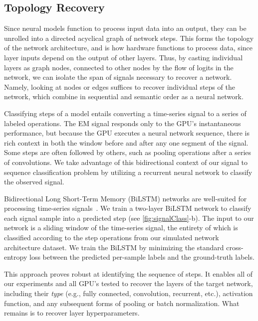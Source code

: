 \documentclass[12pt]{report}
\begin{document}
\vspace{-2mm}
\subsection{Topology Recovery}\label{sec:topo}

Since neural models function to process input data into an output,
they can be unrolled into a directed acyclical graph of network steps.
This forms the topology of the network architecture, and is how
hardware functions to process data, since layer inputs
depend on the output of other layers.
Thus, by casting individual layers as graph nodes, 
connected to other nodes by the flow of logits in the network,
we can isolate the span of signals necessary to recover a network.
Namely, looking at nodes or edges suffices to recover individual
steps of the network, which combine in sequential and semantic order
as a neural network.

Classifying steps of a model entails converting a time-series signal 
to a series of labeled operations. 
The EM signal responds only to the GPU's instantaneous performance, 
but because the GPU executes a neural network sequence, there is rich context
in both the window before and after any one segment of the signal.
Some steps are often followed by others, such as pooling operations after a series of convolutions. 
We take advantage of this bidirectional context of our signal to sequence classification problem by utilizing a recurrent neural network to classify the observed signal. 

Bidirectional Long Short-Term Memory (BiLSTM) networks are well-suited 
for processing time-series signals~\cite{graves2005bidirectional}. 
We train a two-layer BiLSTM network to classify each signal sample 
into a predicted step (see \ref{fig:signalClass}-b). 
The input to our network is a sliding window of the time-series signal,
the entirety of which is classified according to the step operations
from our simulated network architecture dataset.
We train the BiLSTM by
minimizing the standard cross-entropy loss between the predicted per-sample
labels and the ground-truth labels.

This approach proves robust at identifying the sequence of steps.
It enables all of our
experiments and all GPU's tested to
recover the layers of the target
network, including their \emph{type} 
(e.g., fully connected, convolution, recurrent, etc.), 
activation function, and any subsequent 
forms of pooling or batch normalization. 
What remains is to recover layer hyperparameters. 
\end{document}
